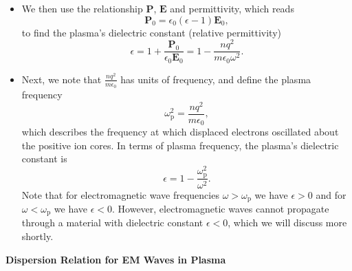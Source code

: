 \documentclass[11pt, a4paper]{article}
\renewcommand{\vec}[1]{\bm{#1}} %
\newcommand{\E}{\vec{E}}  %
\newcommand{\e}{\epsilon}
\newcommand{\ee}{\epsilon_{0}}  %
\renewcommand{\P}{\vec{P}}  %
\begin{document}
\begin{itemize}
	\item We then use the relationship $ \P $, $ \E $ and permittivity, which reads
	\begin{equation*}
		\P_{0} = \ee (\e - 1)\E_{0},
	\end{equation*}
	to find the plasma's dielectric constant (relative permittivity)
	\begin{equation*}
		\e = 1 + \frac{\P_{0}}{\ee \E_{0}} = 1 - \frac{nq^{2}}{m \ee \omega^{2}}.
	\end{equation*}
	
	\item Next, we note that $ \frac{nq^{2}}{m \ee} $ has units of frequency, and define the plasma frequency
	\begin{equation*}
		\omega_{\mathrm{p}}^{2} = \frac{nq^{2}}{m \ee},
	\end{equation*}
	which describes the frequency at which displaced electrons oscillated about the positive ion cores. In terms of plasma frequency, the plasma's dielectric constant is
	\begin{equation*}
		\e = 1 - \frac{\omega_{\mathrm{p}}^{2}}{\omega^{2}}.
	\end{equation*}
	Note that for electromagnetic wave frequencies $ \omega > \omega_{\mathrm{p}} $ we have $ \e > 0 $ and for $ \omega < \omega_{\mathrm{p}} $ we have $ \e < 0 $. However, electromagnetic waves cannot propagate through a material with dielectric constant $ \e < 0 $, which we will discuss more shortly.
\end{itemize}
\textbf{Dispersion Relation for EM Waves in Plasma}
\end{document}
